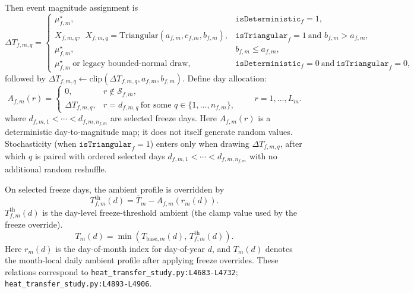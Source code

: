 \documentclass[11pt]{article}
\newcommand{\srcref}[1]{\nolinkurl{#1}}
\begin{document}
Then event magnitude assignment is
\begin{equation}
\label{eq:freeze_event_assignment}
\Delta T_{f,m,q}=
\begin{cases}
\mu_{f,m}^{\star}, & \texttt{isDeterministic}_f=1,\\
X_{f,m,q},\ \ X_{f,m,q}=\mathrm{Triangular}(a_{f,m},c_{f,m},b_{f,m}), & \texttt{isTriangular}_f=1\ \text{and }b_{f,m}>a_{f,m},\\
\mu_{f,m}^{\star}, & b_{f,m}\le a_{f,m},\\
\mu_{f,m}^{\star}\ \text{or legacy bounded-normal draw}, & \texttt{isDeterministic}_f=0\ \text{and}\ \texttt{isTriangular}_f=0,
\end{cases}
\end{equation}
followed by \(\Delta T_{f,m,q}\leftarrow\mathrm{clip}(\Delta T_{f,m,q},a_{f,m},b_{f,m})\).
Define day allocation:
\begin{equation}
\label{eq:freeze_day_anomaly_allocation}
A_{f,m}(r)=
\begin{cases}
0, & r\notin\mathcal{S}_{f,m},\\
\Delta T_{f,m,q}, & r=d_{f,m,q}\ \text{for some }q\in\{1,\dots,n_{f,m}\},
\end{cases}
\qquad r=1,\dots,L_m.
\end{equation}
where \(d_{f,m,1}<\cdots<d_{f,m,n_{f,m}}\) are selected freeze days.
Here \(A_{f,m}(r)\) is a deterministic day-to-magnitude map; it does not itself generate random values.
Stochasticity (when \(\texttt{isTriangular}_f=1\)) enters only when drawing \(\Delta T_{f,m,q}\), after which \(q\) is paired with ordered selected days \(d_{f,m,1}<\cdots<d_{f,m,n_{f,m}}\) with no additional random reshuffle.

On selected freeze days, the ambient profile is overridden by
\begin{equation}
\label{eq:freeze_threshold}
T_{f,m}^{\mathrm{th}}(d)=\bar T_m-A_{f,m}(r_m(d)).
\end{equation}
\(T_{f,m}^{\mathrm{th}}(d)\) is the day-level freeze-threshold ambient (the clamp value used by the freeze override).
\begin{equation}
\label{eq:freeze_override}
T_m(d)=\min\!\left(T_{\mathrm{base},m}(d),\,T_{f,m}^{\mathrm{th}}(d)\right).
\end{equation}
Here \(r_m(d)\) is the day-of-month index for day-of-year \(d\), and \(T_m(d)\) denotes the month-local daily ambient profile after applying freeze overrides.
These relations correspond to \srcref{heat_transfer_study.py:L4683-L4732}; \srcref{heat_transfer_study.py:L4893-L4906}.
\end{document}
